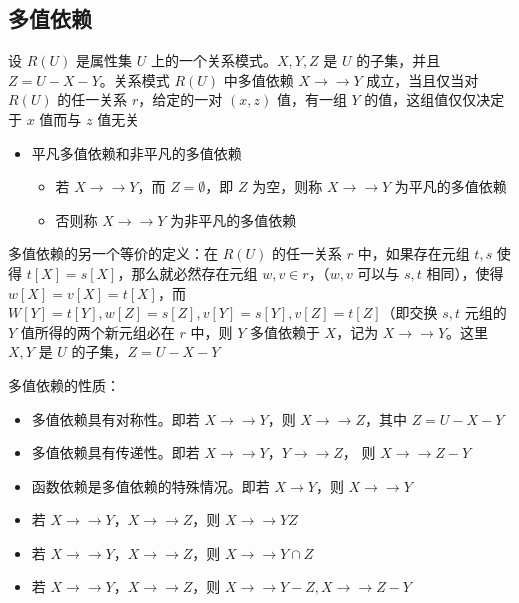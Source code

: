 \subsection{多值依赖}
设 $R(U)$ 是属性集 $U$ 上的一个关系模式。$X,Y,Z$ 是 $U$ 的子集，并且 $Z=U-X-Y$。关系模式 $R(U)$ 中多值依赖 $X\to \to Y$ 成立，当且仅当对 $R(U)$ 的任一关系 $r$，给定的一对 $(x,z)$ 值，有一组 $Y$ 的值，这组值仅仅决定于 $x$ 值而与 $z$ 值无关
\begin{itemize}
    \item 平凡多值依赖和非平凡的多值依赖
    \begin{itemize}
        \item 若 $X\to \to Y$，而 $Z = \emptyset$，即 $Z$ 为空，则称 $X\to \to Y$ 为平凡的多值依赖
        \item 否则称 $X\to \to Y$ 为非平凡的多值依赖
    \end{itemize}
\end{itemize}

多值依赖的另一个等价的定义：在 $R(U)$ 的任一关系 $r$ 中，如果存在元组 $t,s$ 使得 $t[X] = s[X]$，那么就必然存在元组 $w,v \in r$，（$w,v$ 可以与 $s,t$ 相同），使得 $w[X] = v[X] = t[X]$，而 $W[Y] = t[Y],w[Z] = s[Z],v[Y]=s[Y],v[Z]=t[Z]$（即交换 $s,t$ 元组的 $Y$ 值所得的两个新元组必在 $r$ 中，则 $Y$ 多值依赖于 $X$，记为 $X\to\to Y$。这里 $X,Y$ 是 $U$ 的子集，$Z = U-X-Y$

多值依赖的性质：
\begin{itemize}
    \item 多值依赖具有对称性。即若 $X\to\to Y$，则 $X\to\to Z$，其中 $Z=U-X-Y$
    \item 多值依赖具有传递性。即若 $X\to\to Y$，$Y\to\to Z$， 则 $X\to\to Z-Y$
    \item 函数依赖是多值依赖的特殊情况。即若 $X\to Y$，则 $X\to \to Y$
    \item 若 $X\to\to Y$，$X\to\to Z$，则 $X\to \to YZ$
    \item 若 $X\to\to Y$，$X\to\to Z$，则 $X\to \to Y \cap Z$
    \item 若 $X\to\to Y$，$X\to\to Z$，则 $X\to \to Y-Z,X\to \to Z-Y$
\end{itemize}

